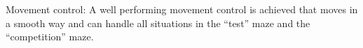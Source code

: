 Movement control: A well performing movement control is achieved that moves in a smooth way and can handle all situations in the “test” maze and the “competition” maze. 